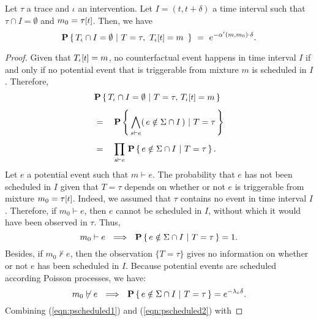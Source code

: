 \begin{theorem*}
  Let $\tau$ a trace
  and $\iota$ an intervention. Let $I = (t, t+\delta)$ a time interval
  such that $\tau \cap I = \emptyset$ and $m_0 =
  \TSTATE{t}{\tau}$. Then, we have
  \[\CProb{ \ATRAJ{} \cap I = \emptyset }{ T=\tau,\
      \TSTATE{t}{\ATRAJ{}} = m\ }
    \ =\ e^{-\alpha'(m, m_0) \cdot \delta}.
  \]
\end{theorem*}
\begin{proof}

  Given that $\TSTATE{t}{\ATRAJ{}} = m$, no counterfactual event
  happens in time interval $I$ if and only if no potential event that
  is triggerable from mixture $m$ is scheduled in $I$. Therefore,
  \vskip 0.0cm
  \begin{equation}\label{eqn:scheduled-decomposition}
    \begin{aligned}
      &\CProb{ \ATRAJ{} \cap I = \emptyset } { T=\tau,\,
        \TSTATE{t}{\ATRAJ{}} = m }
      \\[0.4em]
      &= \quad \CProb{ \bigwedge_{s \vdash e} (\,e \notin \Sigma \cap
        I \,) }{ T=\tau }
      \\[0.4em]
      &= \quad \prod_{s \vdash e}\, \CProb{e \notin \Sigma \cap I }{
        T=\tau }.
    \end{aligned}
  \end{equation}
  \vskip 0.2cm Let $e$ a potential event such that $m \vdash e$. The
  probability that $e$ has not been scheduled in $I$ given that
  $T=\tau$ depends on whether or not $e$ is triggerable from mixture
  $m_0 = \TSTATE{t}{\tau}$. Indeed, we assumed that $\tau$ contains no
  event in time interval $I$. Therefore, if $m_0 \vdash e$, then $e$
  cannot be scheduled in $I$, without which it would have been
  observed in $\tau$.  Thus,
  \begin{equation}\label{eqn:pscheduled1}
    m_0 \vdash e \ \ \Longrightarrow\ \ \mathbf{P} \left\{\, e \notin \Sigma \cap I \ |\ T=\tau  \,\right\} = 1.
  \end{equation}
  Besides, if $m_0 \not\vdash e$, then the observation $\{ T=\tau \}$
  gives no information on whether or not $e$ has been scheduled in
  $I$. Because potential events are scheduled according Poisson
  processes, we have:
  \begin{equation}\label{eqn:pscheduled2}
    m_0 \not\vdash e \ \ \Longrightarrow\ \ \mathbf{P} \left\{\, e \notin \Sigma \cap I \ |\ 
      T=\tau  \,\right\} = e^{-\lambda_e \delta}.
  \end{equation}
  Combining (\ref{eqn:pscheduled1}) and (\ref{eqn:pscheduled2}) with

\end{proof}
